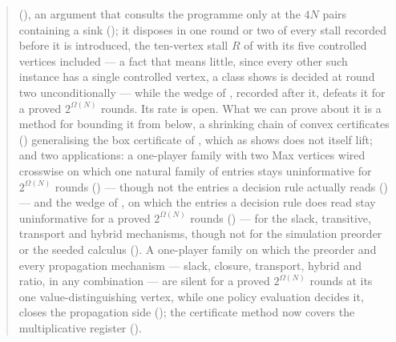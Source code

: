 \documentclass[11pt]{article}
\theoremstyle{plain}
\theoremstyle{definition}
\begin{document}
\begin{abstract}
(), an argument that consults the programme
only at the $4N$ pairs containing a sink (); it
disposes in one round or two of every stall recorded before it is
introduced, the ten-vertex stall $R$ of  with its
five controlled vertices included --- a fact that means little, since
every other such instance has a single controlled vertex, a class
 shows is decided at round two unconditionally
--- while the wedge of , recorded after it, defeats it
for a proved $2^{\Omega(N)}$ rounds. Its rate is open. What we can prove about it is
a method for bounding it from below, a shrinking chain of convex
certificates () generalising the box
certificate of , which as
 shows does not itself lift; and two
applications: a one-player family with two Max vertices wired crosswise on
which one natural family of entries stays uninformative for
$2^{\Omega(N)}$ rounds () --- though not the
entries a decision rule actually reads
() --- and the
wedge of , on which the entries a decision rule does read
stay uninformative for a proved $2^{\Omega(N)}$ rounds
() --- for the slack, transitive,
transport and hybrid mechanisms, though not for the simulation preorder
or the seeded calculus (). A one-player family on which
the preorder and every propagation mechanism --- slack, closure,
transport, hybrid and ratio, in any combination --- are silent for a
proved $2^{\Omega(N)}$ rounds at its one value-distinguishing vertex,
while one policy evaluation decides it, closes the propagation side
(); the certificate method now covers the multiplicative
register ().


\end{abstract}
\end{document}

